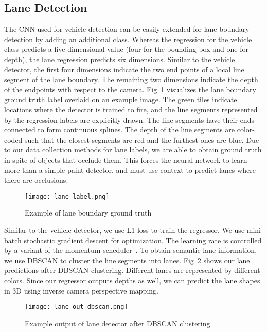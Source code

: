 \documentclass[journal]{IEEEtran}
\begin{document}
\subsection{Lane Detection}
The CNN used for vehicle detection can be easily extended for lane boundary detection by adding an additional class. Whereas the regression for the vehicle class predicts a five dimensional value (four for the bounding box and one for depth), the lane regression predicts six dimensions. Similar to the vehicle detector, the first four dimensions indicate the two end points of a local line segment of the lane boundary. The remaining two dimensions
indicate the depth of the endpoints with respect to the camera. Fig~\ref{fig:lane-gt} visualizes the lane boundary ground truth label overlaid on an example image. The green tiles indicate locations where the detector is trained to fire, and the line segments represented by the regression labels are explicitly drawn. The line segments have their ends connected to form continuous splines. The depth of the line segments are color-coded such that the closest segments are red and the furthest ones are blue. Due to our data collection methods for lane labels, we are able to obtain ground truth in spite of objects that occlude them. This forces the neural network to learn more than a simple paint detector, and must use context to predict lanes where there are occlusions.


\begin{figure}[tb]
  \centering
    \texttt{[image: lane\_label.png]}
 \caption{Example of lane boundary ground truth}
 \label{fig:lane-gt}
\end{figure}

Similar to the vehicle detector, we use L1 loss to train the regressor. We use mini-batch stochastic gradient descent for optimization. The learning rate is controlled by a variant of the momentum scheduler~\cite{sutskever-2013}. To obtain semantic lane information, we use DBSCAN to cluster the line segments into lanes. Fig~\ref{fig:lane-out-dbscan} shows our lane predictions after DBSCAN clustering. Different lanes are represented by different colors. Since our regressor outputs depths as well, we can predict the lane shapes in 3D using inverse camera perspective mapping.


\begin{figure}[tb]
  \centering
    \texttt{[image: lane\_out\_dbscan.png]}
 \caption{Example output of lane detector after DBSCAN clustering}
 \label{fig:lane-out-dbscan}
\end{figure}
\end{document}

